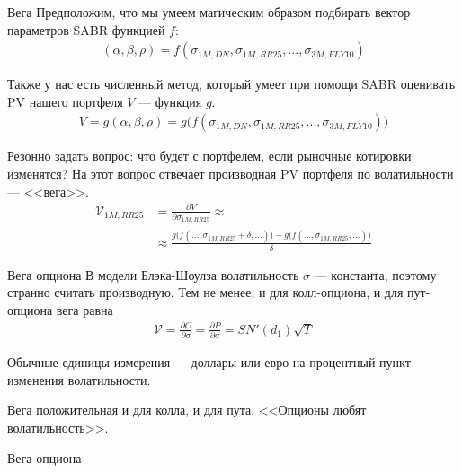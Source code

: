 \documentclass{beamer}
\begin{document}
\begin{frame}{Вега}
\justify
Предположим, что мы умеем магическим образом подбирать вектор параметров SABR функцией $f$:
\begin{align*}
(\alpha, \beta, \rho) = f(\sigma_{1M,DN}, \sigma_{1M,RR25}, ..., \sigma_{3M,FLY10})
\end{align*}

\justify
Также у нас есть численный метод, который умеет при помощи SABR оценивать PV нашего портфеля $V$ --- функция $g$.
\begin{align*}
V = g(\alpha, \beta, \rho) = g\Big(f(\sigma_{1M,DN}, \sigma_{1M,RR25}, ..., \sigma_{3M,FLY10})\Big)
\end{align*}

\justify
Резонно задать вопрос: что будет с портфелем, если рыночные котировки изменятся? На этот вопрос отвечает производная PV портфеля по волатильности --- <<вега>>.
\begin{align*}
\mathcal{V}_{1M,RR25} &= \frac{\partial V}{\partial \sigma_{1M,RR25}} \approx \\
&\approx \frac{g\Big(f(...,\sigma_{1M,RR25}+\delta,...)\Big) - g\Big(f(...,\sigma_{1M,RR25},...)\Big)}{\delta}
\end{align*}
\end{frame}



\begin{frame}{Вега опциона}
\justify
В модели Блэка-Шоулза волатильность $\sigma$ --- константа, поэтому странно считать производную. Тем не менее, и для колл-опциона, и для пут-опциона вега равна
\begin{align*}
\mathcal{V} = \frac{\partial C}{\partial \sigma} = \frac{\partial P}{\partial \sigma} = SN'(d_1)\sqrt{T}
\end{align*}

\justify
Обычные единицы измерения --- доллары или евро на процентный пункт изменения волатильности.

\justify
Вега положительная и для колла, и для пута. <<Опционы любят волатильность>>.
\end{frame}



\begin{frame}{Вега опциона}
\centering
{}
\end{frame}
\end{document}

